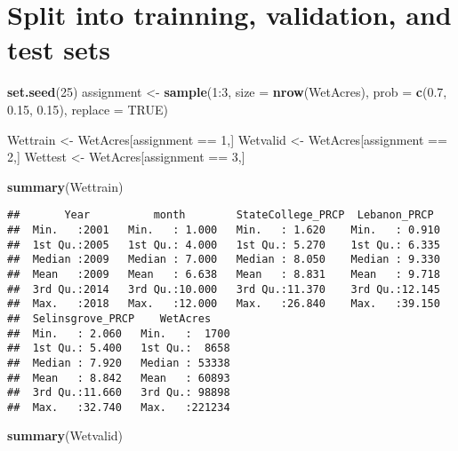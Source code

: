 \documentclass[]{article}
\newenvironment{Shaded}{\begin{snugshade}}{\end{snugshade}}
\newcommand{\KeywordTok}[1]{\textcolor[rgb]{0.13,0.29,0.53}{\textbf{{#1}}}}
\newcommand{\DataTypeTok}[1]{\textcolor[rgb]{0.13,0.29,0.53}{{#1}}}
\newcommand{\DecValTok}[1]{\textcolor[rgb]{0.00,0.00,0.81}{{#1}}}
\newcommand{\FloatTok}[1]{\textcolor[rgb]{0.00,0.00,0.81}{{#1}}}
\newcommand{\StringTok}[1]{\textcolor[rgb]{0.31,0.60,0.02}{{#1}}}
\newcommand{\OtherTok}[1]{\textcolor[rgb]{0.56,0.35,0.01}{{#1}}}
\newcommand{\NormalTok}[1]{{#1}}
\begin{document}
\section{Split into trainning, validation, and test
sets}\label{split-into-trainning-validation-and-test-sets}

\begin{Shaded}
\begin{Highlighting}[]
\KeywordTok{set.seed}\NormalTok{(}\DecValTok{25}\NormalTok{)}
\NormalTok{assignment <-}\StringTok{ }\KeywordTok{sample}\NormalTok{(}\DecValTok{1}\NormalTok{:}\DecValTok{3}\NormalTok{, }\DataTypeTok{size =} \KeywordTok{nrow}\NormalTok{(WetAcres), }\DataTypeTok{prob =} \KeywordTok{c}\NormalTok{(}\FloatTok{0.7}\NormalTok{, }\FloatTok{0.15}\NormalTok{, }\FloatTok{0.15}\NormalTok{), }\DataTypeTok{replace =} \OtherTok{TRUE}\NormalTok{)}

\NormalTok{Wettrain <-}\StringTok{ }\NormalTok{WetAcres[assignment ==}\StringTok{ }\DecValTok{1}\NormalTok{,]}
\NormalTok{Wetvalid <-}\StringTok{ }\NormalTok{WetAcres[assignment ==}\StringTok{ }\DecValTok{2}\NormalTok{,]}
\NormalTok{Wettest <-}\StringTok{ }\NormalTok{WetAcres[assignment ==}\StringTok{ }\DecValTok{3}\NormalTok{,]}

\KeywordTok{summary}\NormalTok{(Wettrain)}
\end{Highlighting}
\end{Shaded}

\begin{verbatim}
##       Year          month        StateCollege_PRCP  Lebanon_PRCP   
##  Min.   :2001   Min.   : 1.000   Min.   : 1.620    Min.   : 0.910  
##  1st Qu.:2005   1st Qu.: 4.000   1st Qu.: 5.270    1st Qu.: 6.335  
##  Median :2009   Median : 7.000   Median : 8.050    Median : 9.330  
##  Mean   :2009   Mean   : 6.638   Mean   : 8.831    Mean   : 9.718  
##  3rd Qu.:2014   3rd Qu.:10.000   3rd Qu.:11.370    3rd Qu.:12.145  
##  Max.   :2018   Max.   :12.000   Max.   :26.840    Max.   :39.150  
##  Selinsgrove_PRCP    WetAcres     
##  Min.   : 2.060   Min.   :  1700  
##  1st Qu.: 5.400   1st Qu.:  8658  
##  Median : 7.920   Median : 53338  
##  Mean   : 8.842   Mean   : 60893  
##  3rd Qu.:11.660   3rd Qu.: 98898  
##  Max.   :32.740   Max.   :221234
\end{verbatim}

\begin{Shaded}
\begin{Highlighting}[]
\KeywordTok{summary}\NormalTok{(Wetvalid)}
\end{Highlighting}
\end{Shaded}
\end{document}
